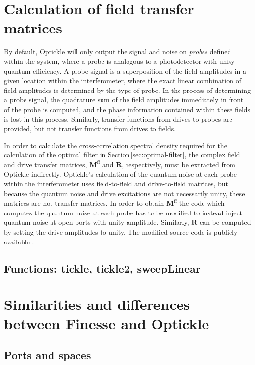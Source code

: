 \section{\label{sec:optickle-field-tfs}Calculation of field transfer matrices}
By default, Optickle will only output the signal and noise on \emph{probes} defined within the system, where a probe is analogous to a photodetector with unity quantum efficiency. A probe signal is a superposition of the field amplitudes in a given location within the interferometer, where the exact linear combination of field amplitudes is determined by the type of probe. In the process of determining a probe signal, the quadrature sum of the field amplitudes immediately in front of the probe is computed, and the phase information contained within these fields is lost in this process. Similarly, transfer functions from drives to probes are provided, but not transfer functions from drives to fields.

In order to calculate the cross-correlation spectral density required for the calculation of the optimal filter in Section\,\ref{sec:optimal-filter}, the complex field and drive transfer matrices, $\mathbf{M}^{\textrm{ff}}$ and $\mathbf{R}$, respectively, must be extracted from Optickle indirectly. Optickle's calculation of the quantum noise at each probe within the interferometer uses field-to-field and drive-to-field matrices, but because the quantum noise and drive excitations are not necessarily unity, these matrices are not transfer matrices. In order to obtain $\mathbf{M}^{\textrm{ff}}$ the code which computes the quantum noise at each probe has to be modified to instead inject quantum noise at open ports with unity amplitude. Similarly, $\mathbf{R}$ can be computed by setting the drive amplitudes to unity. The modified source code is publicly available \cite{controlspaperdata}.

\subsection{Functions: tickle, tickle2, sweepLinear}

\section{Similarities and differences between Finesse and Optickle}

\subsection{Ports and spaces}

